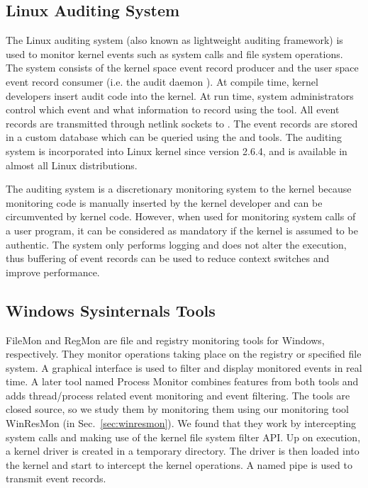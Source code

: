 \subsection{Linux Auditing System}
\label{sec:laudit}

The Linux auditing system (also known as lightweight auditing framework)
is used to monitor kernel events such as system calls and file system
operations.
The system consists of the kernel space event record producer and
the user space event record consumer (i.e. the audit daemon ).
At compile time,
kernel developers insert audit code into the kernel.
At run time, system administrators control which event and what information
to record using the  tool.
All event records are transmitted through netlink sockets to .
The event records are stored in a custom database which can be queried
using the  and  tools.
The auditing system is incorporated into Linux kernel since version 2.6.4,
and is available in almost all Linux distributions.

The auditing system is a discretionary monitoring system to the kernel because
monitoring code is manually inserted by the kernel developer and can
be circumvented by kernel code.
However, when used for monitoring system calls of a user program,
it can be considered as mandatory if the kernel is assumed to be authentic.
The system only performs logging and does not alter the execution,
thus buffering of event records can be used to reduce context switches
and improve performance.

\subsection{Windows Sysinternals Tools}
\label{sec:sysinternals}

FileMon \cite{filemon} and RegMon \cite{regmon}
are file and registry monitoring tools for Windows, respectively.
They monitor operations taking place on
the registry or specified file system.
A graphical interface is used to filter and display monitored events in real time.
A later tool named Process Monitor combines features from both tools
and adds thread/process related event monitoring and event filtering.
The tools are closed source, so we study them by monitoring them
using our monitoring tool WinResMon (in Sec.~\ref{sec:winresmon}).
We found that they work by intercepting system calls and making
use of the kernel file system filter API.
Up on execution, a kernel driver is created in a temporary directory.
The driver is then loaded into the kernel and start to intercept
the kernel operations.
A named pipe is used to transmit event records.


